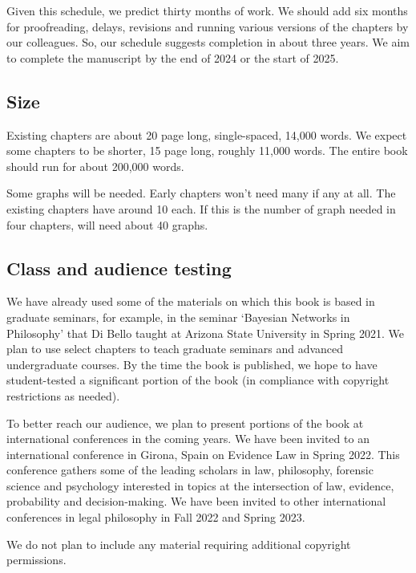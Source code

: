 \documentclass[
  10pt,
  dvipsnames,enabledeprecatedfontcommands]{scrartcl}
\begin{document}
Given this schedule, we predict thirty months of work. We should add six
months for proofreading, delays, revisions and running various versions
of the chapters by our colleagues. So, our schedule suggests completion
in about three years. We aim to complete the manuscript by the end of
2024 or the start of 2025.

\hypertarget{size}{%
\subsection{Size}\label{size}}

Existing chapters are about 20 page long, single-spaced, 14,000 words.
We expect some chapters to be shorter, 15 page long, roughly 11,000
words. The entire book should run for about 200,000 words.

Some graphs will be needed. Early chapters won't need many if any at
all. The existing chapters have around 10 each. If this is the number of
graph needed in four chapters, will need about 40 graphs.

\hypertarget{class-and-audience-testing}{%
\subsection{Class and audience
testing}\label{class-and-audience-testing}}

We have already used some of the materials on which this book is based
in graduate seminars, for example, in the seminar `Bayesian Networks in
Philosophy' that Di Bello taught at Arizona State University in Spring
2021. We plan to use select chapters to teach graduate seminars and
advanced undergraduate courses. By the time the book is published, we
hope to have student-tested a significant portion of the book (in
compliance with copyright restrictions as needed).

To better reach our audience, we plan to present portions of the book at
international conferences in the coming years. We have been invited to
an international conference in Girona, Spain on Evidence Law in Spring
2022. This conference gathers some of the leading scholars in law,
philosophy, forensic science and psychology interested in topics at the
intersection of law, evidence, probability and decision-making. We have
been invited to other international conferences in legal philosophy in
Fall 2022 and Spring 2023.

We do not plan to include any material requiring additional copyright
permissions.
\end{document}
